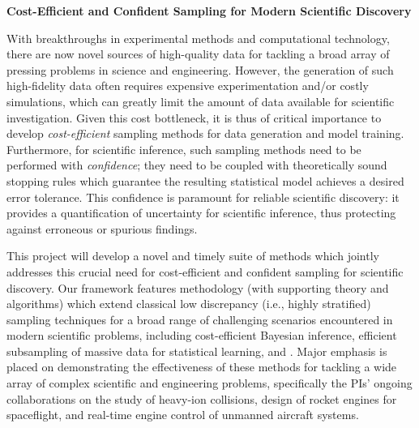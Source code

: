 \documentclass[11pt]{NSFamsart}
\newcommand{\cmtS}[1]{{\color{blue}{(Simon: #1)}}}
\newcommand{\FJHNote}[1]{{\color{blue}Fred: #1}}
\begin{document}

\begin{center}
\Large \textbf{
Cost-Efficient and Confident Sampling for Modern Scientific Discovery
}
\end{center}
%
%



With breakthroughs in experimental methods and computational technology, there are now novel sources of high-quality data for tackling a broad array of pressing problems in science and engineering. However, the generation of such high-fidelity data often requires expensive experimentation and/or costly simulations, which can greatly limit the amount of data available for scientific investigation. Given this cost bottleneck, it is thus of critical importance to develop \textit{cost-efficient} sampling methods for data generation and model training. Furthermore, for scientific inference, such sampling methods need to be performed with \textit{confidence}; they need to be coupled with theoretically sound stopping rules which guarantee the resulting statistical model achieves a desired error tolerance. This confidence is paramount for reliable scientific discovery: it provides a quantification of uncertainty for scientific inference, thus protecting against erroneous or spurious findings.

This project will develop a novel and timely suite of methods which jointly addresses this crucial need for cost-efficient and confident sampling for scientific discovery. Our framework features methodology (with supporting theory and algorithms) which extend classical low discrepancy (i.e., highly stratified) sampling techniques for a broad range of challenging scenarios encountered in modern scientific problems, including cost-efficient Bayesian inference, efficient subsampling of massive data for statistical learning, and \cmtS{...}. Major emphasis is placed on demonstrating the effectiveness of these methods for tackling a wide array of complex scientific and engineering problems, specifically the PIs' ongoing collaborations on the study of heavy-ion collisions, design of rocket engines for spaceflight, and real-time engine control of unmanned aircraft systems.
\end{document}
